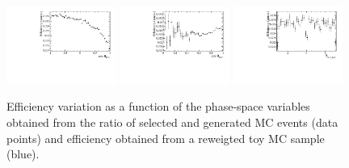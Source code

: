 \begin{figure}[h]
\includegraphics[height=!,width=0.32\textwidth]{figs/AcceptancePhsp/eff_cosTheta_Kpi.pdf}
\includegraphics[height=!,width=0.32\textwidth]{figs/AcceptancePhsp/eff_cosTheta_Dspi.pdf}
\includegraphics[height=!,width=0.32\textwidth]{figs/AcceptancePhsp/eff_phi_Kpi_Dspi.pdf}

\caption{Efficiency variation as a function of the phase-space variables obtained from the ratio of selected and generated MC events (data points) 
and efficiency obtained from a reweigted toy MC sample (blue).
}
\label{fig:PhspEff}
\end{figure}
